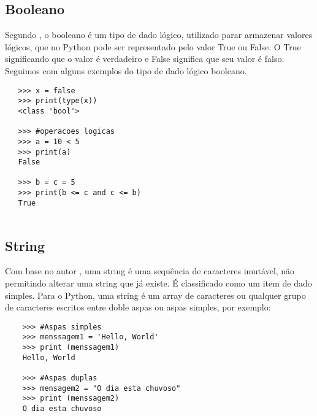 			\subsection{Booleano}
			Segundo \cite{Perkovic2016}, o booleano é um tipo de dado lógico, utilizado parar armazenar valores lógicos, que no Python pode ser representado pelo valor True ou False. O True significando que o valor é verdadeiro e False significa que seu valor é falso. Seguimos com alguns exemplos do tipo de dado lógico booleano.
			\begin{lstlisting}
   >>> x = false
   >>> print(type(x))
   <class 'bool'>
   
   >>> #operacoes logicas
   >>> a = 10 < 5
   >>> print(a)
   False
   
   >>> b = c = 5
   >>> print(b <= c and c <= b)
   True
   
			\end{lstlisting}
            \subsection{String}
            Com base no autor \cite{Severance2016}, uma string é uma sequência de caracteres imutável, não permitindo alterar uma string que já existe. É classificado como um item de dado simples. Para o Python, uma string é um array de caracteres ou qualquer grupo de caracteres escritos entre doble aspas ou aspas simples, por exemplo:
    \begin{lstlisting}
    >>> #Aspas simples
    >>> menssagem1 = 'Hello, World'
    >>> print (menssagem1)  
    Hello, World
    
    >>> #Aspas duplas
    >>> mensagem2 = "O dia esta chuvoso"
    >>> print (menssagem2)
    O dia esta chuvoso
    \end{lstlisting}
			
